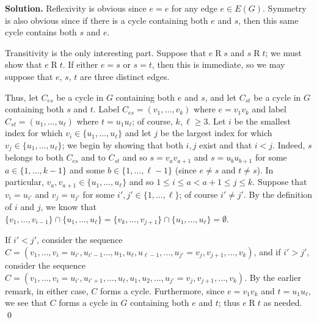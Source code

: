 \documentclass[11pt]{scrartcl}
\theoremstyle{definition}
\newenvironment{solution}{\noindent\textbf{Solution.}}{\qed}
\begin{document}
\begin{solution}
Reflexivity is obvious since $e = e$ for any edge $e\in E(G)$. Symmetry is also obvious since if there is a cycle containing both $e$ and $s$, then this same cycle contains both $s$ and $e$.

Transitivity is the only interesting part. Suppose that $e\mathbin R s$ and $s\mathbin R t$; we must show that $e\mathbin R t$. If either $e = s$ or $s = t$, then this is immediate, so we may suppose that $e$, $s$, $t$ are three distinct edges. 

Thus, let $C_{es}$ be a cycle in $G$ containing both $e$ and $s$, and let $C_{st}$ be a cycle in $G$ containing both $s$ and $t$. Label $C_{es} = (v_1,\dots, v_k)$ where $e = v_1v_k$ and label $C_{st} = (u_1,\dots, u_\ell)$ where $t = u_1u_\ell$; of course, $k,\ell\geq3$. Let $i$ be the smallest index for which $v_i \in \{u_1,\dots,u_\ell\}$ and let $j$ be the largest index for which $v_j\in \{u_1,\dots, u_\ell\}$; we begin by showing that both $i, j$ exist and that $i< j$. Indeed, $s$ belongs to both $C_{es}$ and to $C_{st}$ and so $s=v_av_{a+1}$ and $s=u_bu_{b+1}$  for some $a\in \{1, \dots, k-1\}$ and some $b\in \{1, \dots, \ell -1\}$ (since $e\ne s$ and $t\ne s$).  In particular, $v_a,v_{a+1} \in\{u_1,\dots, u_\ell\}$ and so $1\leq i\leq a< a+1\leq j\leq k$. Suppose that $v_i = u_{i'}$ and $v_j = u_{j'}$ for some $i', j' \in \{1,\dots, \ell\}$; of course $i'\neq j'$. By the definition of $i$ and $j$, we know that $\{v_1,\dots, v_{i-1}\} \cap  \{u_1, \dots , u_\ell\} = \{v_k,\dots , v_{j+1}\} \cap \{u_1,\dots, u_\ell\} = \emptyset$.

If $i' <j'$, consider the sequence $C=(v_1,\dots,v_i =u_{i'},u_{i'-1}\dots,u_1,u_\ell,u_{\ell-1},\dots,u_{j'} =v_j,v_{j+1},\dots ,v_k)$,  and if $i'>j'$, consider the sequence $C =(v_1,\dots ,v_i =u_{i'},u_{i'+1},\dots ,u_\ell,u_1,u_2,\dots, u_{j'} =v_j,v_{j+1},\dots,v_k)$. By the earlier remark, in either case, $C$ forms a cycle. Furthermore, since $e = v_1v_k$ and $t = u_1u_\ell$, we see that $C$ forms a cycle in $G$ containing both $e$ and $t$; thus $e \mathbin R t$ as needed.
\end{solution}
\end{document}
